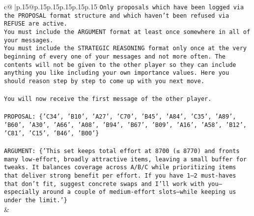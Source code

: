 \documentclass{article}
\begin{document}
{\begin{supertabular}{c@{$\;$}|p{.15\linewidth}@{}p{.15\linewidth}p{.15\linewidth}p{.15\linewidth}p{.15\linewidth}p{.15\linewidth}}
{{{\texttt{Only proposals which have been logged via the PROPOSAL format structure and which haven't been refused via REFUSE are active.} \\
\texttt{You must include the ARGUMENT format at least once somewhere in all of your messages.} \\
\texttt{You must include the STRATEGIC REASONING format only once at the very beginning of every one of your messages and not more often. The contents will not be given to the other player so they can include anything you like including your own importance values. Here you should reason step by step to come up with you next move.} \\
\\ 
\texttt{You will now receive the first message of the other player.} \\
\\ 
\texttt{PROPOSAL: \{'C34', 'B10', 'A27', 'C70', 'B45', 'A84', 'C35', 'A89', 'B60', 'A30', 'A66', 'A08', 'B94', 'B67', 'B09', 'A16', 'A58', 'B12', 'C81', 'C15', 'B46', 'B00'\}} \\
\\ 
\texttt{ARGUMENT: \{'This set keeps total effort at 8700 (≤ 8770) and fronts many low{-}effort, broadly attractive items, leaving a small buffer for tweaks. It balances coverage across A/B/C while prioritizing items that deliver strong benefit per effort. If you have 1–2 must{-}haves that don’t fit, suggest concrete swaps and I’ll work with you—especially around a couple of medium{-}effort slots—while keeping us under the limit.'\}} \\
            }
        }
    }
    & \\ \\


\end{supertabular}}
\end{document}
